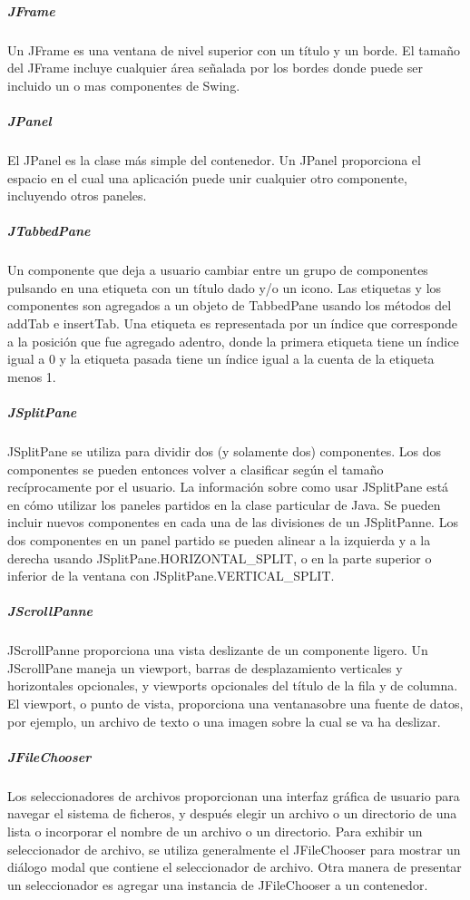 \begin{description}
\subparagraph{JFrame}
Un JFrame es una ventana de nivel superior con un t\'itulo y un borde. El tama\~no del JFrame incluye cualquier \'area se\~nalada por los bordes donde puede ser incluido un o mas componentes de Swing.

\subparagraph{JPanel}
El JPanel es la clase m\'as simple del contenedor. Un JPanel proporciona el espacio en el cual una aplicaci\'on puede unir cualquier otro componente, incluyendo otros paneles.

\subparagraph{JTabbedPane}
Un componente que deja a usuario cambiar entre un grupo de componentes pulsando en una etiqueta con un t\'itulo dado y/o un icono.  Las etiquetas y los componentes son agregados a un objeto de TabbedPane usando los m\'etodos del addTab e insertTab.  Una etiqueta es representada por un \'indice que corresponde a la posici\'on que fue agregado adentro, donde la primera etiqueta tiene un \'indice igual a 0 y la etiqueta pasada tiene un \'indice igual a la cuenta de la etiqueta menos 1.

\subparagraph{JSplitPane}
JSplitPane se utiliza para dividir dos (y solamente dos) componentes. Los dos componentes se pueden entonces volver a clasificar seg\'un el tama\~no rec\'iprocamente por el usuario.  La informaci\'on sobre como usar JSplitPane est\'a en c\'omo utilizar los paneles partidos en la clase particular de Java.   Se pueden incluir nuevos componentes en cada una de las divisiones de un JSplitPanne.  Los dos componentes en un panel partido se pueden alinear a la izquierda y a la derecha usando JSplitPane.HORIZONTAL\_SPLIT, o en la parte superior o inferior de la ventana con JSplitPane.VERTICAL\_SPLIT.

\subparagraph{JScrollPanne}
JScrollPanne proporciona una vista deslizante de un componente ligero. Un JScrollPane maneja un viewport, barras de desplazamiento verticales y horizontales opcionales, y viewports opcionales del t\'itulo de la fila y de columna.  El viewport, o punto de vista, proporciona una ventanasobre una fuente de datos, por ejemplo, un archivo de texto o una imagen sobre la cual se va ha deslizar.

\subparagraph{JFileChooser}
Los seleccionadores de archivos proporcionan una interfaz gr\'afica de usuario para navegar el sistema de ficheros, y despu\'es elegir un archivo o un directorio de una lista o incorporar el nombre de un archivo o un directorio.  Para exhibir un seleccionador  de archivo, se utiliza generalmente el JFileChooser para mostrar un di\'alogo modal que contiene el seleccionador de archivo.  Otra manera de presentar un seleccionador es agregar una instancia de JFileChooser a un contenedor.


\end{description}
